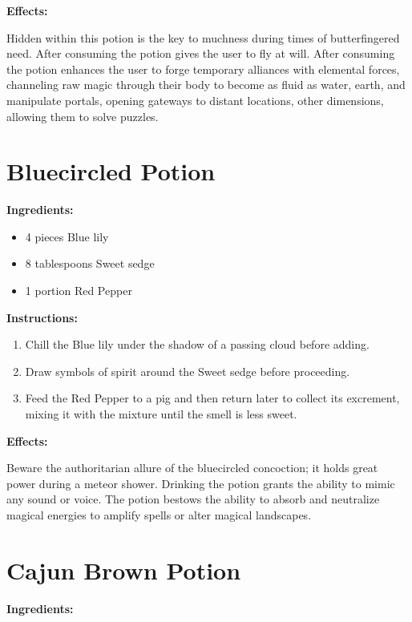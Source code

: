\documentclass{article}
\begin{document}
\textbf{Effects:}

Hidden within this potion is the key to muchness during times of butterfingered need. After consuming the potion gives the user to fly at will. After consuming the potion enhances the user to forge temporary alliances with elemental forces, channeling raw magic through their body to become as fluid as water, earth, and manipulate portals, opening gateways to distant locations, other dimensions, allowing them to solve puzzles.

\newpage
\section*{Bluecircled Potion}

\textbf{Ingredients:}

\begin{itemize}
  \item 4 pieces Blue lily
  \item 8 tablespoons Sweet sedge
  \item 1 portion Red Pepper
\end{itemize}

\textbf{Instructions:}

\begin{enumerate}
  \item Chill the Blue lily under the shadow of a passing cloud before adding.
  \item Draw symbols of spirit around the Sweet sedge before proceeding.
  \item Feed the Red Pepper to a pig and then return later to collect its excrement, mixing it with the mixture until the smell is less sweet.
\end{enumerate}

\textbf{Effects:}

Beware the authoritarian allure of the bluecircled concoction; it holds great power during a meteor shower. Drinking the potion grants the ability to mimic any sound or voice. The potion bestows the ability to absorb and neutralize magical energies to amplify spells or alter magical landscapes.

\newpage
\section*{Cajun Brown Potion}

\textbf{Ingredients:}
\end{document}
